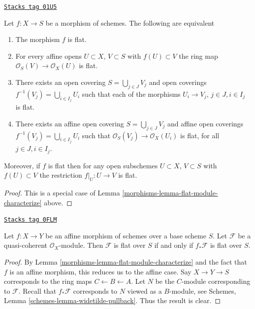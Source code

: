 \begin{lemma}
\label{morphisms-lemma-flat-characterize}
\href{https://stacks.math.columbia.edu/tag/01U5}{\texttt{Stacks tag 01U5}}

Let $f : X \to S$ be a morphism of schemes.
The following are equivalent
\begin{enumerate}
\item The morphism $f$ is flat.
\item For every affine opens $U \subset X$, $V \subset S$
with $f(U) \subset V$ the ring map
$\mathcal{O}_S(V) \to \mathcal{O}_X(U)$ is flat.
\item There exists an open covering $S = \bigcup_{j \in J} V_j$
and open coverings $f^{-1}(V_j) = \bigcup_{i \in I_j} U_i$ such
that each of the morphisms $U_i \to V_j$, $j\in J, i\in I_j$
is flat.
\item There exists an affine open covering $S = \bigcup_{j \in J} V_j$
and affine open coverings $f^{-1}(V_j) = \bigcup_{i \in I_j} U_i$ such
that $\mathcal{O}_S(V_j) \to \mathcal{O}_X(U_i)$ is flat, for all
$j\in J, i\in I_j$.
\end{enumerate}
Moreover, if $f$ is flat then for
any open subschemes $U \subset X$, $V \subset S$ with $f(U) \subset V$
the restriction $f|_U : U \to V$ is flat.
\end{lemma}

\begin{proof}

This is a special case of Lemma \ref{morphisms-lemma-flat-module-characterize}
above.
\end{proof}

\begin{lemma}
\label{morphisms-lemma-pushforward-flat-affine}
\href{https://stacks.math.columbia.edu/tag/0FLM}{\texttt{Stacks tag 0FLM}}

Let $f : X \to Y$ be an affine morphism of schemes over a base scheme $S$.
Let $\mathcal{F}$ be a quasi-coherent $\mathcal{O}_X$-module.
Then $\mathcal{F}$ is flat over $S$ if and only if
$f_*\mathcal{F}$ is flat over $S$.
\end{lemma}

\begin{proof}

By Lemma \ref{morphisms-lemma-flat-module-characterize} and the fact that
$f$ is an affine morphism, this reduces us to the affine case.
Say $X \to Y \to S$ corresponds to the ring maps $C \leftarrow B \leftarrow A$.
Let $N$ be the $C$-module corresponding to $\mathcal{F}$.
Recall that $f_*\mathcal{F}$ corresponds to $N$ viewed as a $B$-module, see
Schemes, Lemma \ref{schemes-lemma-widetilde-pullback}.
Thus the result is clear.
\end{proof}

